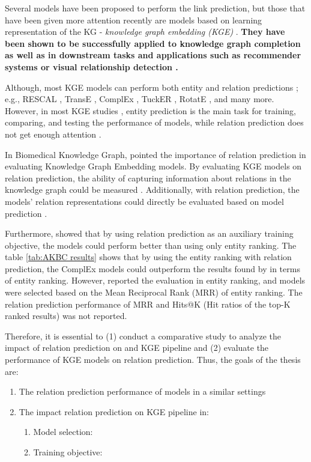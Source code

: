 Several models have been proposed to perform the link prediction, but those that have been given more attention recently are models based on learning representation of the KG - \textit{knowledge graph embedding (KGE)} \citep{wang2017knowledge}. \textbf{They have been shown to be successfully applied to knowledge graph completion \citep{2016} as well as in downstream tasks and applications such as recommender systems \citet{wang2017knowledge} or visual relationship detection \citet{DBLP:conf/semweb/BaierMT17}.}

Although, most KGE models can perform both entity and relation predictions \citep{wang2017knowledge}; e.g., RESCAL \citep{nickel2011three}, TransE \citep{bordes2013translating}, ComplEx \citep{trouillon2016complex}, TuckER \citep{balazevic-etal-2019-tucker}, RotatE \citep{sun2019rotate}, and many more. However, in most KGE studies \citep{yang2014embedding, wang2014knowledge, trouillon2016complex, shang2018endtoend, sun2019rotate}, entity prediction is the main task for training, comparing, and testing the performance of models, while relation prediction does not get enough attention \citep{chang2020benchmark}. 

In Biomedical Knowledge Graph, \citet{chang2020benchmark} pointed the importance of relation prediction in evaluating Knowledge Graph Embedding models. By evaluating KGE models on relation prediction, the ability of capturing information about relations in the knowledge graph could be measured \citep{chang2020benchmark}. Additionally, with relation prediction, the models' relation representations could directly be evaluated based on model prediction \citep{chang2020benchmark}. 

Furthermore, \citet{chen2021relation} showed that by using relation prediction as an auxiliary training objective, the models could perform better than using only entity ranking. The table \ref{tab:AKBC results} shows that by using the entity ranking with relation prediction, the ComplEx models could outperform the results found by \citet{Ruffinelli2020You} in terms of entity ranking. However, \citet{chen2021relation} reported the evaluation in entity ranking, and models were selected based on the Mean Reciprocal Rank (MRR) of entity ranking. The relation prediction performance of MRR and Hits@K (Hit ratios of the top-K ranked results) was not reported. 

Therefore, it is essential to (1) conduct a comparative study to analyze the impact of relation prediction on and KGE pipeline and (2) evaluate the performance of KGE models on relation prediction. Thus, the goals of the thesis are:
\begin{enumerate}
    \item The relation prediction performance of models in a similar settings
    \item The impact relation prediction on KGE pipeline in:
    \begin{enumerate}
        \item Model selection: 
        \item Training objective:
    \end{enumerate}
\end{enumerate}

